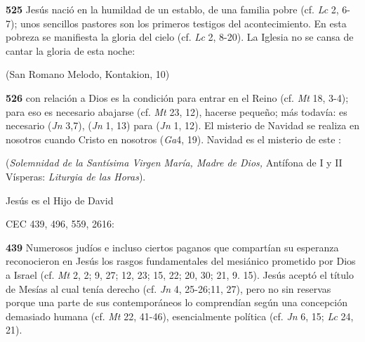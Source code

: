 \textbf{525} Jesús nació en la humildad de un establo, de una familia pobre (cf. \emph{Lc} 2, 6-7); unos sencillos pastores son los primeros testigos del acontecimiento. En esta pobreza se manifiesta la gloria del cielo (cf. \emph{Lc} 2, 8-20). La Iglesia no se cansa de cantar la gloria de esta noche:


(San Romano Melodo, Kontakion, 10)

\textbf{526}  con relación a Dios es la condición para entrar en el Reino (cf. \emph{Mt} 18, 3-4); para eso es necesario abajarse (cf. \emph{Mt} 23, 12), hacerse pequeño; más todavía: es necesario  (\emph{Jn} 3,7),  (\emph{Jn} 1, 13) para  (\emph{Jn} 1, 12). El misterio de Navidad se realiza en nosotros cuando Cristo  en nosotros (\emph{Ga}4, 19). Navidad es el misterio de este :

 (\emph{Solemnidad de la Santísima Virgen María, Madre de Dios,} Antífona de I y II Vísperas: \emph{Liturgia de las Horas}).

Jesús es el Hijo de David

CEC 439, 496, 559, 2616:

\textbf{439} Numerosos judíos e incluso ciertos paganos que compartían su esperanza reconocieron en Jesús los rasgos fundamentales del mesiánico  prometido por Dios a Israel (cf. \emph{Mt} 2, 2; 9, 27; 12, 23; 15, 22; 20, 30; 21, 9. 15). Jesús aceptó el título de Mesías al cual tenía derecho (cf. \emph{Jn} 4, 25-26;11, 27), pero no sin reservas porque una parte de sus contemporáneos lo comprendían según una concepción demasiado humana (cf. \emph{Mt} 22, 41-46), esencialmente política (cf. \emph{Jn} 6, 15; \emph{Lc} 24, 21).


